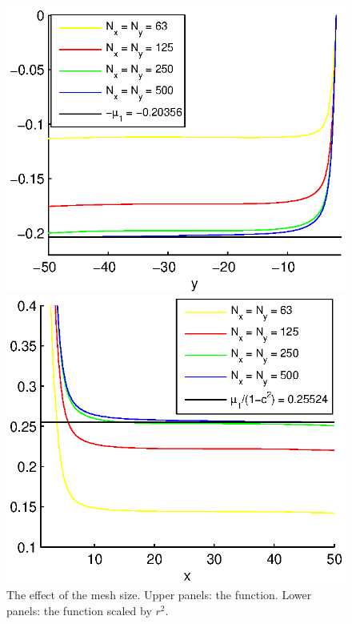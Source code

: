 \documentclass[preprint]{elsarticle}
\begin{document}
\begin{figure}[ht]
\begin{minipage}[b]{0.5\linewidth}
	\end{minipage}
	\begin{minipage}[b]{0.5\linewidth}
		\raggedleft
		\includegraphics[width=\linewidth]{cross-sections/crossSectionX=0.eps}
	\end{minipage}	
	\begin{minipage}[b]{0.5\linewidth}
		\raggedright
		 \includegraphics[width=\linewidth]{cross-sections/crossSectionY=0.eps}
	\end{minipage}
	\caption{The effect of the mesh size. Upper panels: the function. Lower panels: the function scaled by $r^2$.}
	\label{crossSections}
\end{figure}
\end{document}
